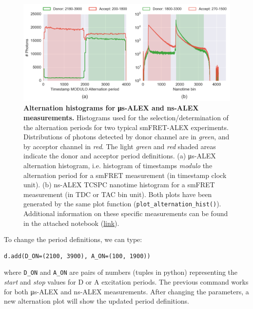 \documentclass[10pt,letterpaper]{article}
\begin{document}
\begin{figure}[h!]
\begin{center}
\includegraphics[width=1\columnwidth]{figures/ALEX_alternation_double/ALEX_alternation_double}
\caption{\label{fig:altern_hist_double}
\textbf{Alternation histograms for μs-ALEX and ns-ALEX measurements.}
Histograms used for the selection/determination
of the alternation periods for two typical smFRET-ALEX experiments.
Distributions of photons detected by donor channel are in \textit{green},
and by acceptor channel in \textit{red}.
The light \textit{green} and \textit{red} shaded areas indicate the donor
and acceptor period definitions.
(a) μs-ALEX alternation histogram, i.e. histogram of timestamps \textit{modulo}
the alternation period for a smFRET measurement (in timestamp clock unit). 
(b) ns-ALEX TCSPC nanotime histogram for a smFRET measurement (in TDC or TAC bin unit).
Both plots have been generated by the same plot function
(\texttt{plot\_alternation\_hist()}).
Additional information on these specific measurements can be found in the
attached notebook
(\href{http://nbviewer.jupyter.org/github/tritemio/fretbursts_paper/blob/master/notebooks/Figures\%20-\%20ALEX\%20histograms.ipynb}{link}).%
}
\end{center}
\end{figure}


To change the period definitions, we can type:

\begin{lstlisting}
d.add(D_ON=(2100, 3900), A_ON=(100, 1900))
\end{lstlisting}

\noindent where \verb|D_ON| and \verb|A_ON| are pairs of numbers (tuples in python) representing
the \textit{start} and \textit{stop} values for D or A excitation periods.
The previous command works for both μs-ALEX and ns-ALEX measurements.
After changing the parameters, a new alternation plot will show the updated
period definitions.
\end{document}
